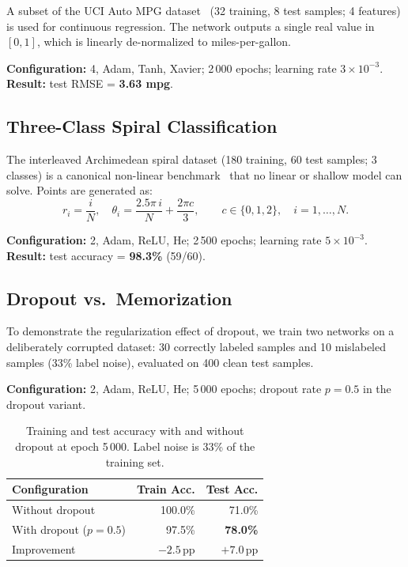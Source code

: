 \documentclass[11pt,a4paper]{article}
\begin{document}
A subset of the UCI Auto MPG dataset~\cite{quinlan1993} (32 training,
8 test samples; 4 features) is used for continuous regression. The
network outputs a single real value in $[0,1]$, which is linearly
de-normalized to miles-per-gallon.

\textbf{Configuration:} 4, Adam, Tanh,
Xavier; 2\,000 epochs; learning rate $3\times10^{-3}$.
\textbf{Result:} test RMSE = \textbf{3.63 mpg}.

\subsection{Three-Class Spiral Classification}

The interleaved Archimedean spiral dataset (180 training, 60 test samples;
3 classes) is a canonical non-linear benchmark~\cite{collobert2004}
that no linear or shallow model can solve. Points are generated as:
\[
  r_i = \frac{i}{N},\quad
  \theta_i = \frac{2.5\pi\,i}{N} + \frac{2\pi c}{3},
  \qquad c \in \{0,1,2\},\quad i=1,\ldots,N.
\]

\textbf{Configuration:} 2, Adam, ReLU,
He; 2\,500 epochs; learning rate $5\times10^{-3}$.
\textbf{Result:} test accuracy = \textbf{98.3\%} (59/60).

\subsection{Dropout vs.\ Memorization}

To demonstrate the regularization effect of dropout, we train two networks
on a deliberately corrupted dataset: 30 correctly labeled samples and
10 mislabeled samples (33\% label noise), evaluated on 400 clean test samples.

\textbf{Configuration:} 2, Adam, ReLU,
He; 5\,000 epochs; dropout rate $p=0.5$ in the dropout variant.

\begin{table}[H]
\centering
\caption{Training and test accuracy with and without dropout at epoch 5\,000.
  Label noise is 33\% of the training set.}
\label{tab:dropout}
\renewcommand{\arraystretch}{1.25}
\begin{tabular}{@{}lrr@{}}
\toprule
Configuration & Train Acc. & Test Acc. \\
\midrule
Without dropout & 100.0\% & 71.0\% \\
With dropout ($p=0.5$) & 97.5\% & \textbf{78.0\%} \\
\midrule
Improvement & $-2.5$\,pp & $+7.0$\,pp \\
\bottomrule
\end{tabular}
\end{table}
\end{document}
